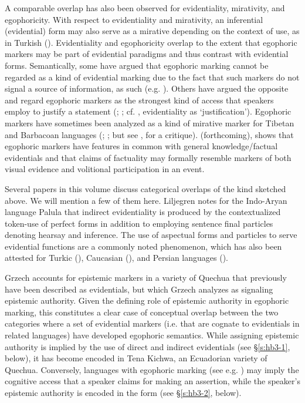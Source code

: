 \documentclass[output=paper]{langsci/langscibook}
\begin{document}
A comparable overlap has also been observed for evidentiality, mirativity, and egophoricity. With respect to evidentiality and mirativity, an inferential (evidential) form may also serve as a mirative depending on the context of use, as in Turkish (\citealt{SlobinAksu1982}). Evidentiality and egophoricity overlap to the extent that egophoric markers may be part of evidential paradigms and thus contrast with evidential forms. Semantically, some have argued that egophoric marking cannot be regarded as a kind of evidential marking due to the fact that such markers do not signal a source of information, as such (e.g. \citealt{Aikhenvald2004}). Others have argued the opposite and regard egophoric markers as the strongest kind of access that speakers employ to justify a statement (\citealt{Plungian2010}; \citealt{SanRoqueLoughnane2012}; cf. \citealt{Boye2012}, evidentiality as ‘justification’). Egophoric markers have sometimes been analyzed as a kind of mirative marker for Tibetan and Barbacoan languages (\citealt{DeLancey1997}; \citealt{Dickinson2000}; but see \citealt{Curnow2002b}, for a critique). \citeauthor{Kittila} (forthcoming), shows that egophoric markers have features in common with general knowledge/factual evidentials and that claims of factuality may formally resemble markers of both visual evidence and volitional participation in an event.

Several papers in this volume discuss categorical overlaps of the kind sketched above. We will mention a few of them here. Liljegren notes for the Indo-Aryan language Palula that indirect evidentiality is produced by the contextualized token-use of perfect forms in addition to employing sentence final particles denoting hearsay and inference. The use of aspectual forms and particles to serve evidential functions are a commonly noted phenomenon, which has also been attested for Turkic (\citealt{SlobinAksu1982}), Caucasian (\citealt{Tatevosov2001}), and Persian languages (\citealt{Lazard1996}).

Grzech accounts for epistemic markers in a variety of Quechua that previously have been described as evidentials, but which Grzech analyzes as signaling epistemic authority. Given the defining role of epistemic authority in egophoric marking, this constitutes a clear case of conceptual overlap between the two categories where a set of evidential markers (i.e. that are cognate to evidentials in related languages) have developed egophoric semantics. While assigning epistemic authority is implied by the use of direct and indirect evidentials (see §\ref{s:hb3-1}, below), it has become encoded in Tena Kichwa, an Ecuadorian variety of Quechua. Conversely, languages with egophoric marking (see e.g. \citealt{Tournadre2008}) may imply the cognitive access that a speaker claims for making an assertion, while the speaker’s epistemic authority is encoded in the form (see §\ref{s:hb3-2}, below).
\end{document}
